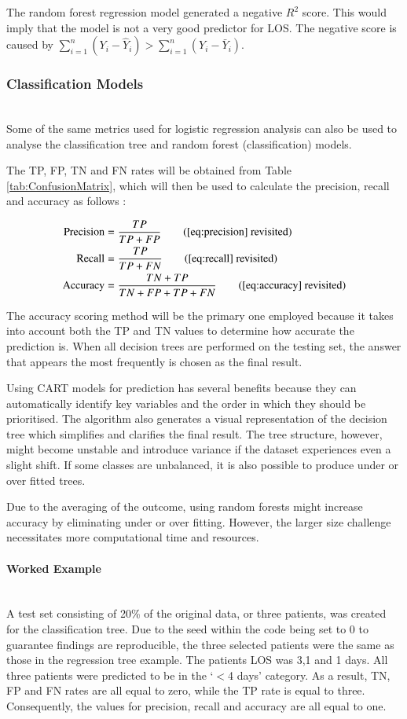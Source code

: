\documentclass[../thesis.tex]{subfiles}
\begin{document}
The random forest regression model generated a negative $R^{2}$ score. This would imply that the model is not a very good predictor for LOS. The negative score is caused by $\sum^n_{i=1} (Y_{i}- \hat{Y}_{i}) >\sum^{n}_{i=1} (Y_{i} -\bar{Y}_{i})$.


\subsubsection{Classification Models}\\
Some of the same metrics used for logistic regression analysis can also be used to analyse the classification tree and random forest (classification) models.

The TP, FP, TN and FN rates will be obtained from Table \ref{tab:ConfusionMatrix}, which will then be used to calculate the precision, recall and accuracy as follows \cite{Baratloo2015}:

\begin{align}
    \text{Precision} &= \frac{TP}{TP + FP}\tag{\ref{eq:precision} revisited}\\
    \text{Recall} &= \frac{TP}{TP + FN}\tag{\ref{eq:recall} revisited}\\
    \text{Accuracy} &= \frac{TN + TP}{TN + FP + TP + FN} \tag{\ref{eq:accuracy} revisited}
\end{align}

The accuracy scoring method will be the primary one employed because it takes into account both the TP and TN values to determine how accurate the prediction is. When all decision trees are performed on the testing set, the answer that appears the most frequently is chosen as the final result.

Using CART models for prediction has several benefits because they can automatically identify key variables and the order in which they should be prioritised. The algorithm also generates a visual representation of the decision tree which simplifies and clarifies the final result. The tree structure, however, might become unstable and introduce variance if the dataset experiences even a slight shift. If some classes are unbalanced, it is also possible to produce under or over fitted trees.

Due to the averaging of the outcome, using random forests might increase accuracy by eliminating under or over fitting. However, the larger size challenge necessitates more computational time and resources.
\paragraph{Worked Example}\\
A test set consisting of 20\% of the original data, or three patients, was created for the classification tree. Due to the seed within the code being set to 0 to guarantee findings are reproducible, the three selected patients were the same as those in the regression tree example.
The patients LOS was 3,1 and 1 days. All three patients were predicted to be in the `$<$4 days' category. As a result, TN, FP and FN rates are all equal to zero, while the TP rate is equal to three. Consequently, the values for precision, recall and accuracy are all equal to one.
\end{document}
